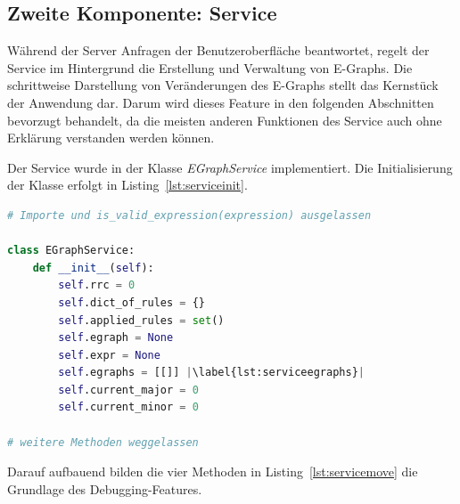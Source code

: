 



\subsection{Zweite Komponente: Service}

Während der Server Anfragen der Benutzeroberfläche beantwortet, regelt der Service im Hintergrund die Erstellung und Verwaltung von E-Graphs.
Die schrittweise Darstellung von Veränderungen des E-Graphs stellt das Kernstück der Anwendung dar. Darum wird dieses Feature in den folgenden Abschnitten bevorzugt behandelt,
da die meisten anderen Funktionen des Service auch ohne Erklärung verstanden werden können.

Der Service wurde in der Klasse \textit{EGraphService} implementiert. Die Initialisierung der Klasse erfolgt in Listing~\ref{lst:serviceinit}.

\begin{lstlisting}[language=Python, escapechar=|, caption=Auszug aus der Datei \textit{EGraphService.py}, label={lst:serviceinit}]
# Importe und is_valid_expression(expression) ausgelassen 

class EGraphService:
    def __init__(self):
        self.rrc = 0
        self.dict_of_rules = {}
        self.applied_rules = set()
        self.egraph = None
        self.expr = None
        self.egraphs = [[]] |\label{lst:serviceegraphs}|
        self.current_major = 0
        self.current_minor = 0

# weitere Methoden weggelassen
\end{lstlisting} 

Darauf aufbauend bilden die vier Methoden in Listing~\ref{lst:servicemove} die Grundlage des Debugging-Features.

